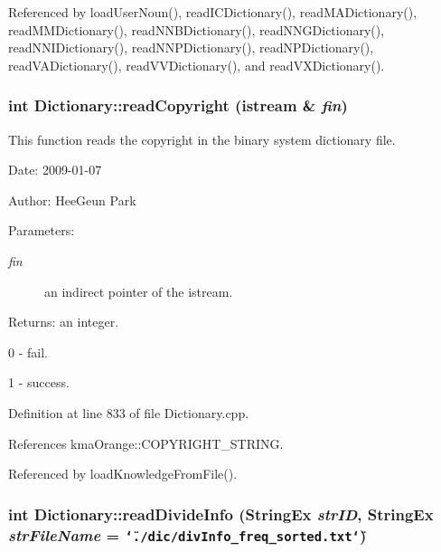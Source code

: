Referenced by loadUserNoun(), readICDictionary(), readMADictionary(), readMMDictionary(), readNNBDictionary(), readNNGDictionary(), readNNIDictionary(), readNNPDictionary(), readNPDictionary(), readVADictionary(), readVVDictionary(), and readVXDictionary().\hypertarget{classkmaOrange_1_1Dictionary_24fb974af5fd5c4f9b471b2b633d78c8}{
\subsubsection[{readCopyright}]{\setlength{\rightskip}{0pt plus 5cm}int Dictionary::readCopyright (istream \& {\em fin})}}
\label{classkmaOrange_1_1Dictionary_24fb974af5fd5c4f9b471b2b633d78c8}


This function reads the copyright in the binary system dictionary file. 

\begin{Desc}
\item[Date:]2009-01-07 \end{Desc}
\begin{Desc}
\item[Author:]HeeGeun Park \end{Desc}
\begin{Desc}
\item[Parameters:]
\begin{description}
\item[{\em fin}]an indirect pointer of the istream. \end{description}
\end{Desc}
\begin{Desc}
\item[Returns:]an integer.\par
 0 - fail.\par
 1 - success. \end{Desc}


Definition at line 833 of file Dictionary.cpp.

References kmaOrange::COPYRIGHT\_\-STRING.

Referenced by loadKnowledgeFromFile().\hypertarget{classkmaOrange_1_1Dictionary_d7bb7409e2b9a69319fb64a96d96543b}{
\subsubsection[{readDivideInfo}]{\setlength{\rightskip}{0pt plus 5cm}int Dictionary::readDivideInfo ({\bf StringEx} {\em strID}, \/  {\bf StringEx} {\em strFileName} = {\tt \char`\"{}./dic/divInfo\_\-freq\_\-sorted.txt\char`\"{}})}}
\label{classkmaOrange_1_1Dictionary_d7bb7409e2b9a69319fb64a96d96543b}


